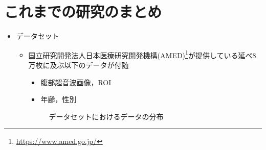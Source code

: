 \documentclass[a4j]{ujarticle}
\begin{document}
    \section{これまでの研究のまとめ}
        \begin{itemize}
            \item データセット
            \begin{itemize}
                \item 国立研究開発法人日本医療研究開発機構(AMED)\footnote{\url{https://www.amed.go.jp/}}が提供している延べ8万枚に及ぶ以下のデータが付随
                \begin{itemize}
                    \item 腹部超音波画像，ROI
                    \item 年齢，性別
                \end{itemize}
                \begin{figure}[h]
                    \centering
                    \caption{データセットにおけるデータの分布}

\end{figure}
\end{itemize}
\end{itemize}
\end{document}
